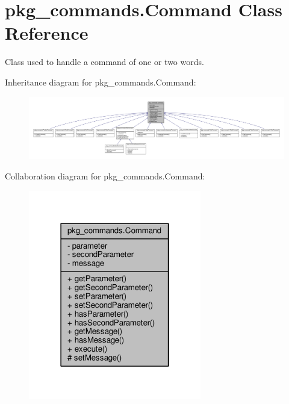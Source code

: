 \hypertarget{classpkg__commands_1_1Command}{\section{pkg\-\_\-commands.\-Command Class Reference}
\label{classpkg__commands_1_1Command}
}


Class used to handle a command of one or two words.  




Inheritance diagram for pkg\-\_\-commands.\-Command\-:
\nopagebreak
\begin{figure}[H]
\begin{center}
\leavevmode
\includegraphics[width=350pt]{classpkg__commands_1_1Command__inherit__graph}
\end{center}
\end{figure}


Collaboration diagram for pkg\-\_\-commands.\-Command\-:
\nopagebreak
\begin{figure}[H]
\begin{center}
\leavevmode
\includegraphics[width=214pt]{classpkg__commands_1_1Command__coll__graph}
\end{center}
\end{figure}
